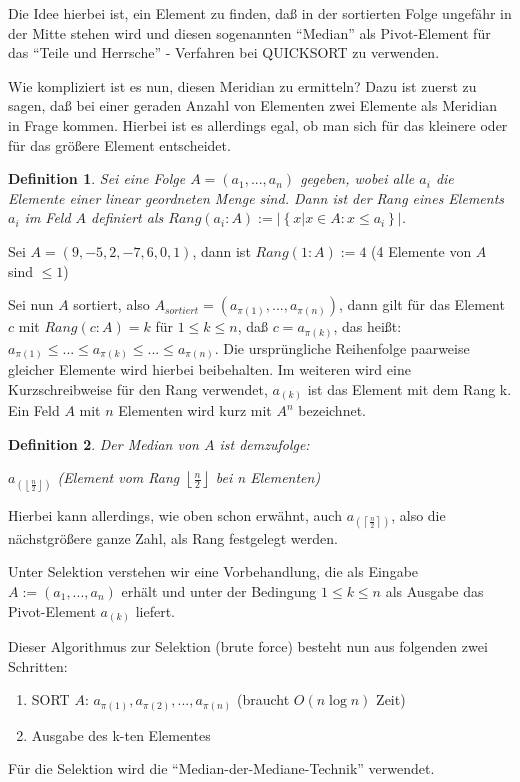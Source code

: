 \documentclass[ngerman,draft,parskip=half*,twoside]{scrreprt}
\theoremstyle{break}
\newtheorem{definition}{Definition}
\begin{document}
 Die Idee hierbei ist, ein Element zu finden, daß in der sortierten Folge ungefähr in der Mitte stehen wird und diesen sogenannten
 "`Median"' als Pivot-Element für das "`Teile und Herrsche"' - Verfahren bei \textsc{QUICKSORT} zu verwenden.

 Wie kompliziert ist es nun, diesen Meridian zu ermitteln? Dazu ist zuerst zu sagen, daß bei einer geraden Anzahl von Elementen zwei
 Elemente als Meridian in Frage kommen. Hierbei ist es allerdings egal, ob man sich für das kleinere oder für das größere Element
 entscheidet.

\begin{definition}
 Sei eine Folge $A=(a_{1}, ... , a_{n})$ gegeben, wobei alle $a_{i}$ die Elemente einer linear geordneten Menge sind. 
 Dann ist der Rang eines Elements $a_i$ im Feld $A$ definiert als $Rang(a_{i}:A):=\left|\left\{x|x \in A:x\leq a_{i}\right\}\right|$.
\end{definition}

 Sei $A=(9,-5,2,-7,6,0,1)$, dann ist $Rang(1:A):=4$ (4 Elemente von $A$ sind $\leq 1$)
\bigskip

Sei nun $A$ sortiert, also $A_{sortiert}=(a_{\pi(1)}, ... , a_{\pi(n)})$, dann gilt für das Element $c$ mit $Rang(c:A)=k$ für $1\leq k
\leq n$, daß $c=a_{\pi(k)}$, das heißt:
$a_{\pi(1)}\leq ... \leq a_{\pi(k)}\leq ... \leq a_{\pi(n)}$.
Die ursprüngliche Reihenfolge paarweise gleicher Elemente wird hierbei beibehalten. Im weiteren wird
eine Kurzschreibweise für den Rang verwendet, $a_{(k)}$ ist das Element mit dem Rang k. Ein Feld $A$ mit $n$ Elementen wird kurz mit $A^n$
bezeichnet.

\begin{definition}
Der Median von $A$ ist demzufolge:

$a_{\left(\left\lfloor \frac{n}{2}\right\rfloor\right)}$ (Element vom Rang $\left\lfloor \frac{n}{2}\right\rfloor$ bei n Elementen)
\end{definition}

Hierbei kann allerdings, wie oben schon erwähnt, auch $a_{\left(\left\lceil \frac{n}{2}\right\rceil\right)}$, also die nächstgrößere
ganze Zahl, als Rang festgelegt werden.

Unter Selektion verstehen wir eine Vorbehandlung, die als Eingabe 
$A:=(a_{1}, ... , a_{n})$ erhält und unter der Bedingung $1\leq k\leq n$ als Ausgabe das Pivot-Element $a_{(k)}$ liefert.

 Dieser Algorithmus zur Selektion (brute force) besteht nun aus folgenden zwei Schritten:
 \begin{enumerate}
	\item SORT $A$: $a_{\pi(1)}, a_{\pi(2)}, ... , a_{\pi(n)}$ (braucht $O(n \log n)$ Zeit)
	\item Ausgabe des k-ten Elementes
 \end{enumerate}
 Für die Selektion wird die "`Median-der-Mediane-Technik"' verwendet. 
\end{document}
